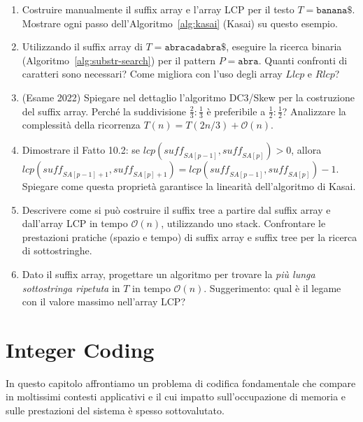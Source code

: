 \documentclass[12pt, a4paper, oneside]{book}
\theoremstyle{plain}
\theoremstyle{definition}
\theoremstyle{remark}
\newcommand{\OO}[1]{\mathcal{O}\!\left(#1\right)}
\begin{document}
\begin{enumerate}
  \item Costruire manualmente il suffix array e l'array LCP per il testo $T = \texttt{banana\$}$. Mostrare ogni passo dell'Algoritmo~\ref{alg:kasai} (Kasai) su questo esempio.

  \item Utilizzando il suffix array di $T = \texttt{abracadabra\$}$, eseguire la ricerca binaria (Algoritmo~\ref{alg:substr-search}) per il pattern $P = \texttt{abra}$. Quanti confronti di caratteri sono necessari? Come migliora con l'uso degli array $\mathit{Llcp}$ e $\mathit{Rlcp}$?

  \item (Esame 2022) Spiegare nel dettaglio l'algoritmo DC3/Skew per la costruzione del suffix array. Perché la suddivisione $\frac{2}{3}:\frac{1}{3}$ è preferibile a $\frac{1}{2}:\frac{1}{2}$? Analizzare la complessità della ricorrenza $T(n) = T(2n/3) + \OO{n}$.

  \item Dimostrare il Fatto 10.2: se $lcp(\mathit{suff}_{SA[p-1]}, \mathit{suff}_{SA[p]}) > 0$, allora $lcp(\mathit{suff}_{SA[p-1]+1}, \mathit{suff}_{SA[p]+1}) = lcp(\mathit{suff}_{SA[p-1]}, \mathit{suff}_{SA[p]}) - 1$. Spiegare come questa proprietà garantisce la linearità dell'algoritmo di Kasai.

  \item Descrivere come si può costruire il suffix tree a partire dal suffix array e dall'array LCP in tempo $\OO{n}$, utilizzando uno stack. Confrontare le prestazioni pratiche (spazio e tempo) di suffix array e suffix tree per la ricerca di sottostringhe.

  \item Dato il suffix array, progettare un algoritmo per trovare la \emph{più lunga sottostringa ripetuta} in $T$ in tempo $\OO{n}$. Suggerimento: qual è il legame con il valore massimo nell'array LCP?
\end{enumerate}

\chapter{Integer Coding}
\label{ch:integer-coding}

In questo capitolo affrontiamo un problema di codifica fondamentale che compare in moltissimi contesti applicativi e il cui impatto sull'occupazione di memoria e sulle prestazioni del sistema è spesso sottovalutato.
\end{document}
